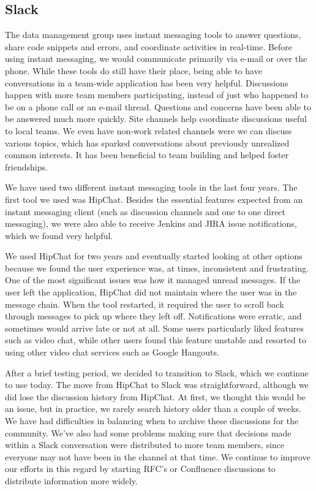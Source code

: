 \subsection{Slack}

The data management group uses instant messaging tools to answer questions, 
share code snippets and errors, and coordinate activities in real-time.  
Before using instant messaging, we would communicate primarily via e-mail or 
over the phone. While these tools do still have their place, being able to have 
conversations in a team-wide application has been very helpful. Discussions
happen with more team members participating, instead of just who happened to
be on a phone call or an e-mail thread. Questions and concerns have been able
to be answered much more quickly.  Site channels help coordinate discussions
useful to local teams.  We even have non-work related channels were we can
discuss various topics, which has sparked conversations about previously
unrealized common interests. It has been beneficial to team building and 
helped foster friendships.

We have used two different instant messaging tools in the last four years. The
first tool we used was HipChat. Besides the essential features expected
from an instant messaging client (such as discussion channels and one
to one direct messaging), we were also able to receive Jenkins and JIRA issue
notifications, which we found very helpful.

We used HipChat for two years and eventually started looking at other options 
because we found the user experience was, at times, inconsistent and 
frustrating. One of the most significant issues was how it managed unread
messages. If the user left the application, HipChat did not maintain where the
user was in the message chain. When the tool restarted, it required the user
to scroll back through messages to pick up where they left off. Notifications
were erratic, and sometimes would arrive late or not at all. Some users
particularly liked features such as video chat, while other users found this
feature unstable and resorted to using other video chat services such as Google 
Hangouts. 

After a brief testing period, we decided to transition to Slack, which we
continue to use today. The move from HipChat to Slack was straightforward,
although we did lose the discussion history from HipChat.  At first, we 
thought this would be an issue, but in practice, we rarely search history older
than a couple of weeks.  We have had difficulties in balancing when to 
archive these discussions for the community.  We've also had some problems
making sure that decisions made within a Slack conversation were
distributed to more team members, since everyone may not have been in the 
channel at that time.  We continue to improve our efforts in this regard by 
starting RFC's or Confluence discussions to distribute information more widely.

